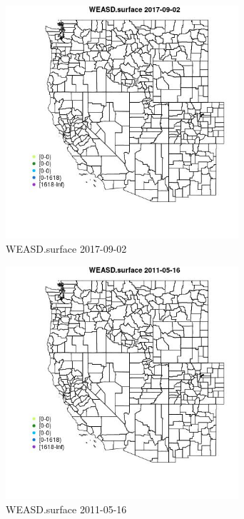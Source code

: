 \begin{figure} 
\centering  
\includegraphics[width=0.77\textwidth]{Code_Outputs/Report_ML_input_PM25_Step4_part_e_de_duplicated_aveswNAs_MapObsWEASDsurface2017-09-02.jpg} 
\caption{\label{fig:Report_ML_input_PM25_Step4_part_e_de_duplicated_aveswNAsMapObsWEASDsurface2017-09-02}WEASD.surface 2017-09-02} 
\end{figure} 
 

\begin{figure} 
\centering  
\includegraphics[width=0.77\textwidth]{Code_Outputs/Report_ML_input_PM25_Step4_part_e_de_duplicated_aveswNAs_MapObsWEASDsurface2011-05-16.jpg} 
\caption{\label{fig:Report_ML_input_PM25_Step4_part_e_de_duplicated_aveswNAsMapObsWEASDsurface2011-05-16}WEASD.surface 2011-05-16} 
\end{figure} 
 

